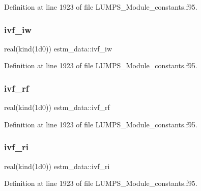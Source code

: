 Definition at line 1923 of file L\+U\+M\+P\+S\+\_\+\+Module\+\_\+constants.\+f95.

\mbox{\label{namespaceestm__data_ace7c6cd6fc62d3dad2691279b6f7569c}} 
\subsubsection{\texorpdfstring{ivf\+\_\+iw}{ivf\_iw}}
{\footnotesize\ttfamily real(kind(1d0)) estm\+\_\+data\+::ivf\+\_\+iw}



Definition at line 1923 of file L\+U\+M\+P\+S\+\_\+\+Module\+\_\+constants.\+f95.

\mbox{\label{namespaceestm__data_a3353758e0f87a694352d364605c265cd}} 
\subsubsection{\texorpdfstring{ivf\+\_\+rf}{ivf\_rf}}
{\footnotesize\ttfamily real(kind(1d0)) estm\+\_\+data\+::ivf\+\_\+rf}



Definition at line 1923 of file L\+U\+M\+P\+S\+\_\+\+Module\+\_\+constants.\+f95.

\mbox{\label{namespaceestm__data_a15423f952e1c9866ae15180ff4e08244}} 
\subsubsection{\texorpdfstring{ivf\+\_\+ri}{ivf\_ri}}
{\footnotesize\ttfamily real(kind(1d0)) estm\+\_\+data\+::ivf\+\_\+ri}



Definition at line 1923 of file L\+U\+M\+P\+S\+\_\+\+Module\+\_\+constants.\+f95.

\mbox{\label{namespaceestm__data_ad040589ab34bca345b5bc4004048bed1}} 
